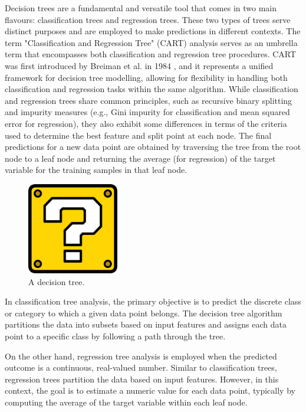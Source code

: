 Decision trees are a fundamental and versatile tool that comes in two main flavours: classification trees and regression trees. These two types of trees serve distinct purposes and are employed to make predictions in different contexts. The term "Classification and Regression Tree" (CART) analysis serves as an umbrella term that encompasses both classification and regression tree procedures. CART was first introduced by Breiman et al. in 1984 \cite{breiman2017classification}, and it represents a unified framework for decision tree modelling, allowing for flexibility in handling both classification and regression tasks within the same algorithm. While classification and regression trees share common principles, such as recursive binary splitting and impurity measures (e.g., Gini impurity for classification and mean squared error for regression), they also exhibit some differences in terms of the criteria used to determine the best feature and split point at each node. The final predictions for a new data point are obtained by traversing the tree from the root node to a leaf node and returning the average (for regression) of the target variable for the training samples in that leaf node.

\begin{figure}[h]
	\includegraphics[width=4cm]{Figures/missing.png}
	\centering
	\caption{A decision tree.}
	\label{building_BASS}
\end{figure}

In classification tree analysis, the primary objective is to predict the discrete class or category to which a given data point belongs. The decision tree algorithm partitions the data into subsets based on input features and assigns each data point to a specific class by following a path through the tree.

On the other hand, regression tree analysis is employed when the predicted outcome is a continuous, real-valued number. Similar to classification trees, regression trees partition the data based on input features. However, in this context, the goal is to estimate a numeric value for each data point, typically by computing the average of the target variable within each leaf node.

